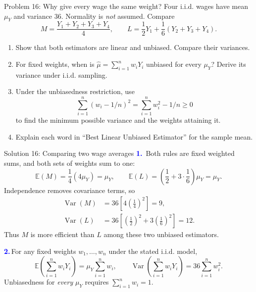 \documentclass[notes,10pt, aspectratio=169]{beamer}
\newif\ifshowsolutions
\newcommand{\E}{\mathbb{E}}
\newcommand{\Var}{\operatorname{Var}}
\newcommand{\answerpart}[1]{\textcolor{blue}{\textbf{#1.}}\,}
\begin{document}
\begin{frame}{Problem 16: Why give every wage the same weight?}
Four i.i.d. wages have mean $\mu_Y$ and variance $36$. Normality is \emph{not} assumed. Compare
\[
M=\frac{Y_1+Y_2+Y_3+Y_4}{4},\qquad
L=\frac12Y_1+\frac16(Y_2+Y_3+Y_4).
\]
\begin{enumerate}
\setlength{\itemsep}{7pt}
\item Show that both estimators are linear and unbiased. Compare their variances.
\item For fixed weights, when is $\widehat\mu=\sum_{i=1}^n w_iY_i$ unbiased for every $\mu_Y$? Derive its variance under i.i.d. sampling.
\item Under the unbiasedness restriction, use
\[
\sum_{i=1}^n(w_i-1/n)^2=\sum_{i=1}^n w_i^2-1/n\geq0
\]
to find the minimum possible variance and the weights attaining it.
\item Explain each word in ``Best Linear Unbiased Estimator'' for the sample mean.
\end{enumerate}
\end{frame}

\ifshowsolutions
\begin{frame}{Solution 16: Comparing two wage averages}
\small
\answerpart{1}
Both rules are fixed weighted sums, and both sets of weights sum to one:
\[
\E(M)=\frac14(4\mu_Y)=\mu_Y,
\qquad
\E(L)=\left(\frac12+3\cdot\frac16\right)\mu_Y=\mu_Y.
\]
Independence removes covariance terms, so
\[
\begin{aligned}
\Var(M)&=36\left[4\left(\frac14\right)^2\right]=9,\\[3pt]
\Var(L)&=36\left[\left(\frac12\right)^2+3\left(\frac16\right)^2\right]=12.
\end{aligned}
\]
Thus $M$ is more efficient than $L$ among these two unbiased estimators.
\vspace{.15cm}

\answerpart{2}For any fixed weights $w_1,\ldots,w_n$ under the stated i.i.d. model,
\[
\E\left(\sum_{i=1}^n w_iY_i\right)=\mu_Y\sum_{i=1}^n w_i,
\qquad
\Var\left(\sum_{i=1}^n w_iY_i\right)=36\sum_{i=1}^n w_i^2.
\]
Unbiasedness for \emph{every} $\mu_Y$ requires $\sum_{i=1}^n w_i=1$.
\end{frame}
\end{document}
